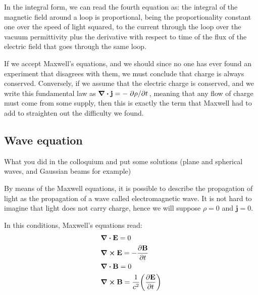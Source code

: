 \documentclass[11pt,a4paper]{article}
\begin{document}
In the integral form, we can read the fourth equation as: the integral of the magnetic field around a loop is proportional, being the proportionality constant one over the speed of light squared, to the current through the loop over the vacuum permittivity plus the derivative with respect to time of the flux of the electric field that goes through the same loop.

If we accept Maxwell's equations, and we should since no one has ever found an experiment that disagrees with them, we must conclude that charge is always conserved. Conversely, if we assume that the electric charge is conserved, and we write this fundamental law as $\div\vb{j}=-\pdv*{\rho}{t}$, meaning that any flow of charge must come from some supply, then this is exactly the term that Maxwell had to add to straighten out the difficulty we found.

\subsection{Wave equation}
What you did in the colloquium and put some solutions (plane and spherical waves, and Gaussian beams for example)

By means of the Maxwell equations, it is possible to describe the propagation of light as the propagation of a wave called electromagnetic wave. It is not hard to imagine that light does not carry charge, hence we will suppose $\rho=0$ and $\textbf{j}=0$.

In this conditions, Maxwell's equations read:
\begin{subequations}\label{eq:maxwell_equations_wo_charge}
\begin{align}
&\div\vb{E}=0\label{eq:maxwell__wo_1}\\
&\curl\vb{E}=-\pdv{\vb{B}}{t}\label{eq:maxwell_wo_2}\\
&\div\vb{B}=0\label{eq:maxwell_wo_3}\\
&\curl\vb{B}=\frac{1}{c^2}\qty(\pdv{\vb{E}}{t})\label{eq:maxwell_wo_4}
\end{align}
\end{subequations}
\end{document}
